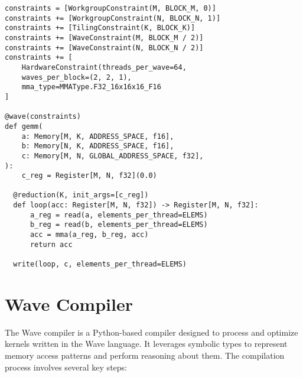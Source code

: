 \documentclass{article}
\begin{document}
\begin{lstlisting}[language=Wave, frame=single, breaklines, caption={Mixed-precision $C = A \times B^{T}$ expressed in Wave.}, captionpos=b, label={lst:gemm}]
constraints = [WorkgroupConstraint(M, BLOCK_M, 0)]
constraints += [WorkgroupConstraint(N, BLOCK_N, 1)]
constraints += [TilingConstraint(K, BLOCK_K)]
constraints += [WaveConstraint(M, BLOCK_M / 2)]
constraints += [WaveConstraint(N, BLOCK_N / 2)]
constraints += [
    HardwareConstraint(threads_per_wave=64,
    waves_per_block=(2, 2, 1),
    mma_type=MMAType.F32_16x16x16_F16
]

@wave(constraints)
def gemm(
    a: Memory[M, K, ADDRESS_SPACE, f16],
    b: Memory[N, K, ADDRESS_SPACE, f16],
    c: Memory[M, N, GLOBAL_ADDRESS_SPACE, f32],
):
    c_reg = Register[M, N, f32](0.0)

  @reduction(K, init_args=[c_reg])
  def loop(acc: Register[M, N, f32]) -> Register[M, N, f32]:
      a_reg = read(a, elements_per_thread=ELEMS)
      b_reg = read(b, elements_per_thread=ELEMS)
      acc = mma(a_reg, b_reg, acc)
      return acc

  write(loop, c, elements_per_thread=ELEMS)
\end{lstlisting}

\newpage

\section{Wave Compiler}
\label{section:wave_compiler}
The Wave compiler is a Python-based compiler designed to process and optimize kernels written in the Wave language. It leverages symbolic types to represent memory access patterns and perform reasoning about them. The compilation process involves several key steps:
\end{document}
